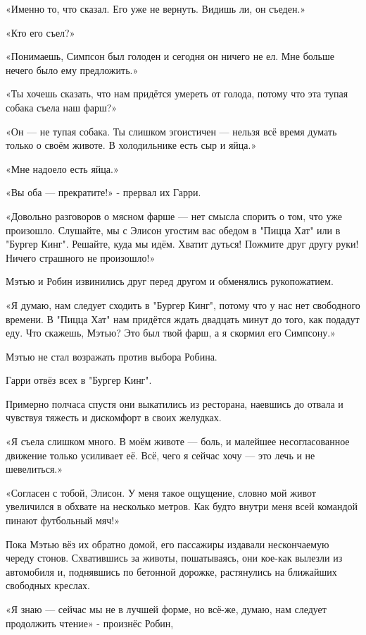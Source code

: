 \documentclass[a4paper,12pt]{book}
\begin{document}
«Именно то, что сказал. Его уже не вернуть. Видишь ли, он съеден.»
\par
«Кто его съел?»
\par
«Понимаешь, Симпсон был голоден и сегодня он ничего не ел. Мне больше нечего было ему предложить.»
\par
«Ты хочешь сказать, что нам придётся умереть от голода, потому что эта тупая собака съела наш фарш?»
\par
«Он — не тупая собака. Ты слишком эгоистичен — нельзя всё время думать только о своём животе. В холодильнике есть сыр и яйца.»
\par
«Мне надоело есть яйца.»
\par
«Вы оба — прекратите!» - прервал их Гарри.
\par
«Довольно разговоров о мясном фарше — нет смысла спорить о том, что уже произошло. Слушайте, мы с Элисон угостим вас обедом в "Пицца Хат" или в "Бургер Кинг". Решайте, куда мы идём. Хватит дуться! Пожмите друг другу руки! Ничего страшного не произошло!»
\par
Мэтью и Робин извинились друг перед другом и обменялись рукопожатием.
\par
«Я думаю, нам следует сходить в "Бургер Кинг", потому что у нас нет свободного времени. В "Пицца Хат" нам придётся ждать двадцать минут до того, как подадут еду. Что скажешь, Мэтью? Это был твой фарш, а я скормил его Симпсону.»
\par
Мэтью не стал возражать против выбора Робина.
\par
Гарри отвёз всех в "Бургер Кинг".\\
\par
Примерно полчаса спустя они выкатились из ресторана, наевшись до отвала и чувствуя тяжесть и дискомфорт в своих желудках.
\par
«Я съела слишком много. В моём животе — боль, и малейшее несогласованное движение только усиливает её. Всё, чего я сейчас хочу — это лечь и не шевелиться.»
\par
«Согласен с тобой, Элисон. У меня такое ощущение, словно мой живот увеличился в обхвате на несколько метров. Как будто внутри меня всей командой пинают футбольный мяч!»
\par
Пока Мэтью вёз их обратно домой, его пассажиры издавали нескончаемую череду стонов. Схватившись за животы, пошатываясь, они кое-как вылезли из автомобиля и, поднявшись по бетонной дорожке, растянулись на ближайших свободных креслах.
\par
«Я знаю — сейчас мы не в лучшей форме, но всё-же, думаю, нам следует продолжить чтение» - произнёс Робин,
\end{document}
